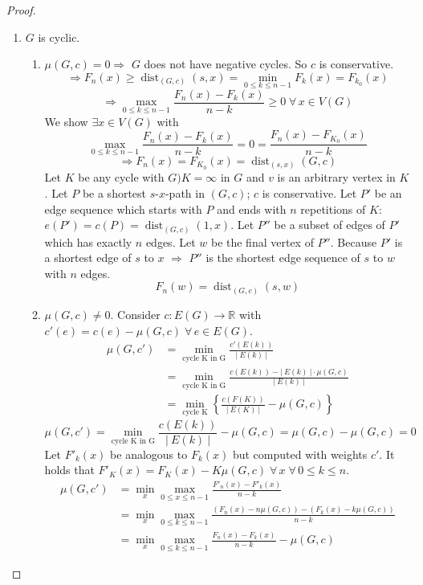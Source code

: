 \documentclass{article}
\newcommand{\card}[1]{\left|\:\!#1\:\!\right|}
\newcommand{\set}[1]{\left\{#1\right\}}
\newcommand{\gath}[2]{$#1$-$#2$-path} %
\newcommand{\fall}{\;\forall\,}
\begin{document}
\begin{proof}
\begin{enumerate}
  \item $G$ is cyclic.
    \begin{enumerate}
      \item $\mu(G, c) = 0 \Rightarrow$ $G$ does not have negative cycles. So $c$ is conservative.
        \[
          \Rightarrow F_n(x) \geq \operatorname{dist}_{(G,c)} (s, x) = \min_{0 \leq k \leq n-1} F_k(x) = F_{k_0}(x)
        \] \[
          \Rightarrow \max_{0 \leq k \leq n-1} \frac{F_n(x) - F_k(x)}{n-k} \geq 0 \fall x \in V(G)
        \]
        We show $\exists x \in V(G)$ with \[
          \max_{0 \leq k \leq n-1} \frac{F_n(x) - F_k(x)}{n-k} = 0
            = \frac{F_n(x) - F_{K_0}(x)}{n-k}
        \] \[
          \Rightarrow F_n(x)
            = F_{K_0}(x)
            = \operatorname{dist}_{(s, x)}(G, c)
        \]
        Let $K$ be any cycle with $G)K = \infty$ in $G$ and $v$ is an arbitrary vertex in $K$. Let $P$ be a shortest \gath sx in $(G, c)$; $c$ is conservative. Let $P'$ be an edge sequence which starts with $P$ and ends with $n$ repetitions of $K$: $e(P') = c(P) = \operatorname{dist}_{(G, c)}(1, x)$. Let $P''$ be a subset of edges of $P'$ which has exactly $n$ edges. Let $w$ be the final vertex of $P''$. Because $P'$ is a shortest edge of $s$ to $x$ $\Rightarrow$ $P''$ is the shortest edge sequence of $s$ to $w$ with $n$ edges.
        \[
          F_n(w) = \operatorname{dist}_{(G, c)}(s, w)
        \]
      \item $\mu(G, c) \neq 0$. Consider $c: E(G) \rightarrow \mathbb{R}$ with $c'(e) = c(e) - \mu(G, c) \fall e \in E(G)$.
        \begin{align*}
          \mu(G, c') &= \min_{\text{cycle K in G}} \frac{c'(E(k))}{\card{E(k)}} \\
                     &= \min_{\text{cycle K in G}} \frac{c(E(k)) - \card{E(k)} \cdot \mu(G, c)}{\card{E(k)}} \\
                     &= \min_{\text{cycle K}}\set{\frac{c(F(K))}{\card{E(K)}} - \mu(G, c)}
        \end{align*} \[
          \mu(G, c') = \min_{\text{cycle K in G}} \frac{c(E(k))}{\card{E(k)}} - \mu(G, c) = \mu(G, c) - \mu(G, c) = 0
        \]
        Let $F'_k(x)$ be analogous to $F_k(x)$ but computed with weights $c'$.
        It holds that $F'_K(x) = F_K(x) - K \mu(G, c) \fall x \fall 0 \leq k \leq n$.
        \begin{align*}
          \mu(G, c')
            &= \min_x \max_{0 \leq x \leq n-1} \frac{F'_n(x) - F'_k(x)}{n-k} \\
            &= \min_x \max_{0 \leq k \leq n-1} \frac{(F_n(x) - n\mu(G, c)) - (F_k(x) - k\mu(G, c))}{n-k} \\
            &= \min_x \max_{0 \leq k \leq n-1} \frac{F_n(x) - F_k(x)}{n-k} - \mu(G, c)
        \end{align*}
    \end{enumerate}
\end{enumerate}
\end{proof}
\end{document}
